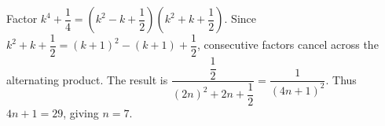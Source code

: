 Factor $k^4+\dfrac{1}{4}=(k^2-k+\dfrac{1}{2})(k^2+k+\dfrac{1}{2})$. Since $k^2+k+\dfrac{1}{2}=(k+1)^2-(k+1)+\dfrac{1}{2}$, consecutive factors cancel across the alternating product. The result is $\dfrac{\dfrac{1}{2}}{(2n)^2 + 2 n + \dfrac{1}{2}} = \dfrac{1}{(4n+1)^2}$. Thus $4n+1=29$, giving $\boxed{n=7}$.
